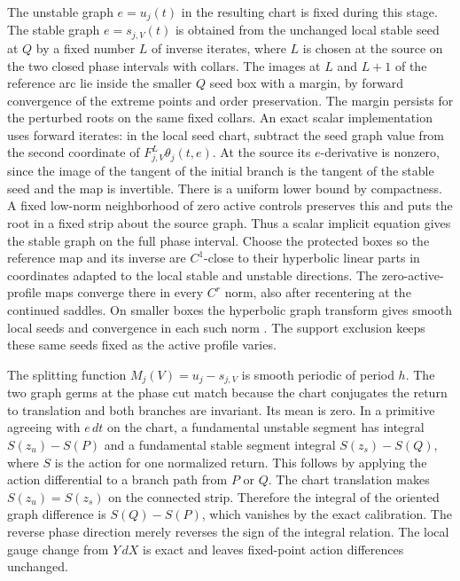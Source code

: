\documentclass[11pt]{article}
\begin{document}
The unstable graph \(e=u_j(t)\) in the resulting chart is fixed during this
stage. The stable graph \(e=s_{j,V}(t)\) is obtained from the unchanged local
stable seed at \(Q\) by a fixed number \(L\) of inverse iterates, where \(L\) is chosen at the source on the two closed phase intervals
with collars. The images at \(L\) and \(L+1\) of the reference arc
lie inside the smaller \(Q\) seed box with a margin, by forward
convergence of the extreme points and order preservation. The margin
persists for the perturbed roots on the same fixed collars. An exact
scalar implementation uses forward iterates: in the local seed chart, subtract
the seed graph value from the second coordinate of \(F_{j,V}^{L}\theta_j(t,e)\). At the
source its \(e\)-derivative is nonzero, since the image of the tangent of the
initial branch is the tangent of the stable seed and the map is invertible.
There is a uniform lower bound by compactness. A fixed low-norm neighborhood of
zero active controls preserves this and puts the root in a fixed strip about the
source graph. Thus a scalar implicit equation gives the stable graph on the full
phase interval. Choose the protected boxes so the reference map and its inverse
are \(C^1\)-close to their hyperbolic linear parts in coordinates adapted to the
local stable and unstable directions. The zero-active-profile maps converge
there in every \(C^r\) norm, also after recentering at the continued saddles. On
smaller boxes the hyperbolic graph transform gives smooth local seeds and
convergence in each such norm \cite[Theorems 2.3--2.4]{HP}. The support
exclusion keeps these same seeds fixed as the active profile varies.

The splitting function \(M_{j}(V)=u_j-s_{j,V}\) is smooth periodic of period
\(h\). The two graph germs at the phase cut match because the chart conjugates
the return to translation and both branches are invariant. Its mean is zero. In
a primitive agreeing with \(e\,dt\) on the chart, a fundamental unstable segment
has integral \(S(z_u)-S(P)\) and a fundamental stable segment integral
\(S(z_s)-S(Q)\), where \(S\) is the action for one normalized return. This
follows by applying the action differential to a branch path from \(P\) or
\(Q\). The chart translation makes \(S(z_u)=S(z_s)\) on the connected strip.
Therefore the integral of the oriented graph difference is \(S(Q)-S(P)\), which
vanishes by the exact calibration. The reverse phase direction merely reverses
the sign of the integral relation. The local gauge change from \(Y\,dX\) is
exact and leaves fixed-point action differences unchanged.
\end{document}
